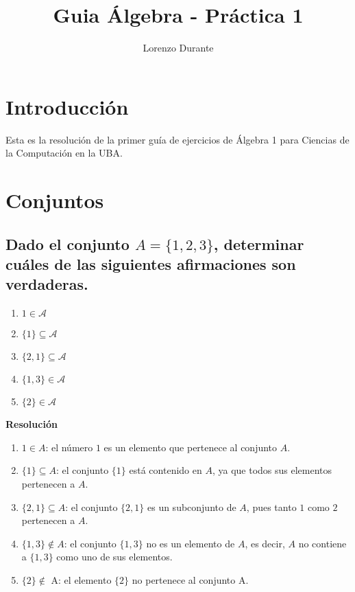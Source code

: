 \documentclass{article}
\title{Guia Álgebra - Práctica 1}
\author{Lorenzo Durante}
\begin{document}
\maketitle

\section{Introducción}
{Esta es la resolución de la primer guía de ejercicios de Álgebra 1 para Ciencias de la Computación en la UBA.}

\section{Conjuntos}
\subsection{Dado el conjunto \texorpdfstring{$A = \{ 1, 2, 3\}$}{A = {1, 2, 3}}, determinar cuáles de las siguientes afirmaciones son verdaderas.}

\begin{enumerate}[label=\roman*)]
    \item $1 \in \mathcal{A}$
    \item $\{1\} \subseteq \mathcal{A}$
    \item $\{2,1\} \subseteq \mathcal{A}$
    \item $\{1,3\} \in \mathcal{A}$
    \item $\{2\} \in \mathcal{A}$
\end{enumerate}
\textbf{Resolución}

\begin{enumerate}[label=\roman*)]
    \item $1 \in A$: el número $1$ es un elemento que pertenece al conjunto $A$.
    
    \item $\{1\} \subseteq A$: el conjunto $\{1\}$ está contenido en $A$, ya que todos sus elementos pertenecen a $A$.
    
    \item $\{2,1\} \subseteq A$: el conjunto $\{2,1\}$ es un subconjunto de $A$, pues tanto $1$ como $2$ pertenecen a $A$.
    
    \item $\{1,3\} \notin A$: el conjunto $\{1,3\}$ no es un elemento de $A$, es decir, $A$ no contiene a $\{1,3\}$ como uno de sus elementos.
    \item $\{2\} \notin$ A: el elemento $\{2\}$ no pertenece al conjunto A. 
\end{enumerate}
\end{document}

